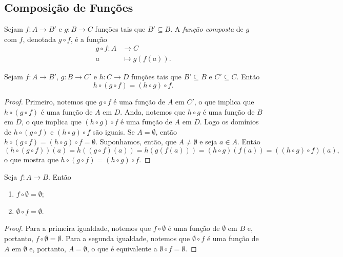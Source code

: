 \subsection{Composição de Funções}

\begin{defi}
	Sejam $f: A \to B'$ e $g: B \to C$ funções tais que $B' \subseteq B$. A \emph{função composta} de $g$ com $f$, denotada $g \circ f$, é a função
	\begin{align*}
	g \circ f : A &\to C \\
				a &\mapsto g(f(a)).
	\end{align*}
\end{defi}

\begin{prop}
\label{prop:comp.func.asso}
	Sejam $f: A \to B'$, $g: B \to C'$ e $h: C \to D$ funções tais que $B' \subseteq B$ e $C' \subseteq C$. Então
	\begin{equation*}
	h \circ (g \circ f) = (h \circ g) \circ f.
	\end{equation*}
\end{prop}
\begin{proof}
	Primeiro, notemos que $g \circ f$ é uma função de $A$ em $C'$, o que implica que $h \circ (g \circ f)$ é uma função de $A$ em $D$. Anda, notemos que $h \circ g$ é uma função de $B$ em $D$, o que implica que $(h \circ g) \circ f$ é uma função de $A$ em $D$. Logo os domínios de $h \circ (g \circ f)$ e $(h \circ g) \circ f$ são iguais. Se $A=\emptyset$, então $h \circ (g \circ f) = (h \circ g) \circ f = \emptyset$. Suponhamos, então, que $A \neq \emptyset$ e seja $a \in A$. Então
	\begin{equation*}
	(h \circ (g \circ f))(a) = h((g \circ f)(a)) = h(g(f(a))) = (h \circ g)(f(a)) = ((h \circ g) \circ f)(a),
	\end{equation*}
o que mostra que $h \circ (g \circ f) = (h \circ g) \circ f$. 
\end{proof}

\begin{prop}
	Seja $f: A \to B$. Então
	\begin{enumerate}
	\item $f \circ \emptyset = \emptyset$;
	\item $\emptyset \circ f = \emptyset$.
	\end{enumerate}
\end{prop}
\begin{proof}
	Para a primeira igualdade, notemos que $f \circ \emptyset$ é uma função de $\emptyset$ em $B$ e, portanto, $f \circ \emptyset=\emptyset$. Para a segunda igualdade, notemos que $\emptyset \circ f$ é uma função de $A$ em $\emptyset$ e, portanto, $A=\emptyset$, o que é equivalente a $\emptyset \circ f=\emptyset$.
\end{proof}

